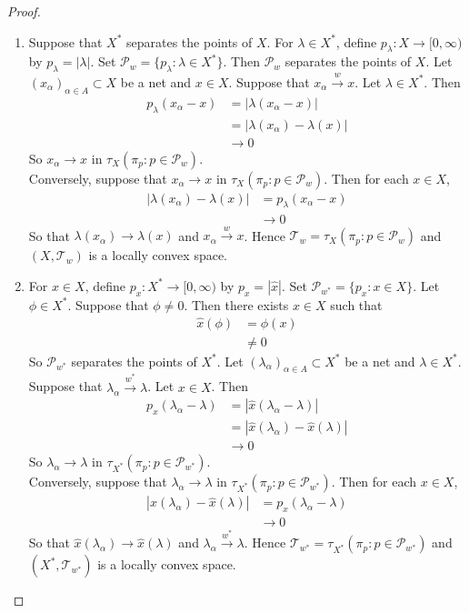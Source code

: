 \documentclass[12pt]{amsart}
\theoremstyle{definition}
\newcommand{\al}{\alpha}
\newcommand{\lam}{\lambda}
\newcommand{\MP}{\mathcal{P}}
\newcommand{\MT}{\mathcal{T}}
\newcommand{\Rg}{[0,\infty)}
\newcommand{\conv}[1]{\xrightarrow{#1}}
\begin{document}
	\begin{proof}\
		\begin{enumerate}
			\item Suppose that $X^*$ separates the points of $X$. For $\lam \in X^*$, define $p_{\lam}:X \rightarrow \Rg$ by $p_{\lam} = |\lam|$. Set $\MP_{w} = \{p_{\lam}: \lam \in X^*\}$. Then $\MP_{w}$ separates the points of $X$. Let $(x_{\al})_{\al \in A} \subset X$ be a net and $x \in X$. Suppose that $x_{\al} \conv{w} x$. Let $\lam \in X^*$. Then 
			\begin{align*}
				p_{\lam}(x_{\al} - x) 
				&= |\lam(x_{\al} - x)| \\
				&= |\lam(x_{\al}) - \lam(x)| \\
				& \rightarrow 0
			\end{align*}
			So $x_{\al} \rightarrow x$ in $\tau_X(\pi_p: p \in \MP_w)$. \\
			Conversely, suppose that $x_{\al} \rightarrow x$ in $\tau_X(\pi_p: p \in \MP_w)$. Then for each $x \in X$,
			\begin{align*}
				|\lam(x_{\al}) - \lam(x)|
				&= p_{\lam}(x_{\al} - x) \\
				& \rightarrow 0
			\end{align*}
			So that $\lam(x_{\al}) \rightarrow \lam(x)$ and $x_{\al} \conv{w} x$. Hence $\MT_{w} = \tau_{X}(\pi_p: p \in \MP_{w})$ and $(X, \MT_{w})$ is a locally convex space.  \\
			\item For $x \in X$, define $p_x:X^* \rightarrow \Rg$ by $p_x = |\hat{x}|$. Set $\MP_{w^*} = \{p_x:x \in X\}$. Let $\phi \in X^*$. Suppose that $\phi \neq 0$. Then there exists $x \in X$ such that 
			\begin{align*}
				\hat{x}(\phi)
				& = \phi(x)  \\
				& \neq 0
			\end{align*}
			So $\MP_{w^*}$ separates the points of $X^*$. Let $(\lam_{\al})_{\al \in A} \subset X^*$ be a net and $\lam \in X^*$. Suppose that $\lam_{\al} \conv{w^*} \lam$. Let $x \in X$. Then 
			\begin{align*}
				p_x(\lam_{\al} - \lam) 
				&= |\hat{x}(\lam_{\al} - \lam)| \\
				&= |\hat{x}(\lam_{\al}) - \hat{x}(\lam)| \\
				& \rightarrow 0
			\end{align*}
			So $\lam_{\al} \rightarrow \lam$ in $\tau_{X^*}(\pi_p: p \in \MP_{w^*})$. \\
			Conversely, suppose that $\lam_{\al} \rightarrow \lam $ in $\tau_{X^*}(\pi_p: p \in \MP_{w^*})$. Then for each $x \in X$,
			\begin{align*}
				|\hat{x}(\lam_{\al}) - \hat{x}(\lam)|
				&= p_x(\lam_{\al} - \lam) \\
				& \rightarrow 0
			\end{align*}
			So that $\hat{x}(\lam_{\al}) \rightarrow \hat{x}(\lam)$ and $\lam_{\al} \conv{w^*} \lam$. Hence $\MT_{w^*} = \tau_{X^*}(\pi_p: p \in \MP_{w^*})$ and $(X^*, \MT_{w^*})$ is a locally convex space.  
		\end{enumerate}
	\end{proof}
\end{document}
